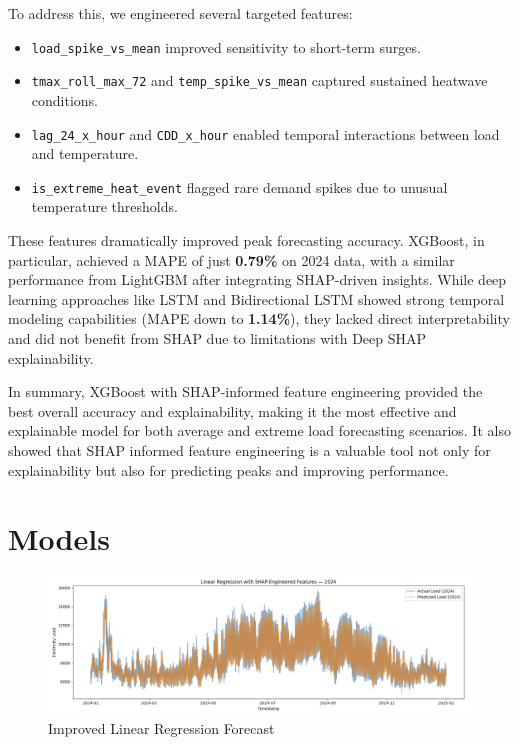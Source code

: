 \documentclass[final,numbered]{ifacconf}
\begin{document}
To address this, we engineered several targeted features:
\begin{itemize}
\item \texttt{load_spike_vs_mean} improved sensitivity to short-term surges.
\item \texttt{tmax_roll_max_72} and \texttt{temp_spike_vs_mean} captured sustained heatwave conditions.
\item \texttt{lag_24_x_hour} and \texttt{CDD_x_hour} enabled temporal interactions between load and temperature.
\item \texttt{is_extreme_heat_event} flagged rare demand spikes due to unusual temperature thresholds.
\end{itemize}

These features dramatically improved peak forecasting accuracy. XGBoost, in particular, achieved a MAPE of just \textbf{0.79\%} on 2024 data, with a similar performance from LightGBM after integrating SHAP-driven insights. While deep learning approaches like LSTM and Bidirectional LSTM showed strong temporal modeling capabilities (MAPE down to \textbf{1.14\%}), they lacked direct interpretability and did not benefit from SHAP due to limitations with Deep SHAP explainability.

In summary, XGBoost with SHAP-informed feature engineering provided the best overall accuracy and explainability, making it the most effective and explainable model for both average and extreme load forecasting scenarios. It also showed that SHAP informed feature engineering is a valuable tool not only for explainability but also for predicting peaks and improving performance.
\clearpage
\section{Models}
\begin{figure}[htbp]
    \centering
    \includegraphics[width=1.05\textwidth]{linearImproved.png} 
    \caption{Improved Linear Regression Forecast}
    \label{fig:load_patterns2}
\end{figure}
\end{document}
